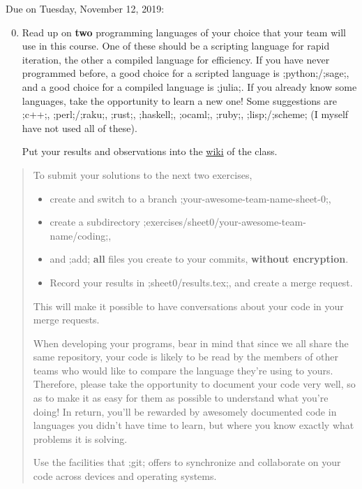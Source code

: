 \documentclass[11pt]{amsart}
\newcommand{\alert}[1]{\textbf{\color{red}#1}}
\begin{document}
\bigskip\bigskip
\begin{center}
  \color{blue}Due on Tuesday, November 12, 2019:
\end{center}

\medskip
\begin{enumerate}
  \setcounter{enumi}{-1}
\item
  Read up on \alert{two} programming languages of your choice that your team will use in this course.
  One of these should be a scripting language for rapid iteration, the other a compiled language for efficiency.
  If you have never programmed before, a good choice for a scripted language is ;python;/;sage;, and a good choice for a compiled language is ;julia;.
  If you already know some languages, take the opportunity to learn a new one! Some suggestions are ;c++;, ;perl;/;raku;, ;rust;, ;haskell;, ;ocaml;, ;ruby;, ;lisp;/;scheme;
  (I myself have not used all of these).

  \medskip
  Put your results and observations into the \href{https://gitlab.mat-apl.upc.edu/julian.pfeifle/2019-dag-upc/wikis/programming-languages}{wiki} of the class.
\end{enumerate}

\bigskip

\begin{quotation}\small
  To submit your solutions to the next two exercises,

  \medskip
  \begin{itemize}[$\quad\triangleright$]
  \item create and switch to a branch ;your-awesome-team-name-sheet-0;,
  \item create a subdirectory ;exercises/sheet0/your-awesome-team-name/coding;,
  \item and ;add; \alert{all} files you create to your commits, \alert{without encryption}.
  \item Record your results in ;sheet0/results.tex;, and create a merge request.
  \end{itemize}

  \medskip
  \noindent This will make it possible to have conversations about your code in your merge requests.

  \medskip
  When developing your programs, bear in mind that since we all share the same repository,
  your code is likely to be read by the members of other teams who would like to compare the language they're using to yours.
  Therefore, please take the opportunity to document your code very well, so as to make it as easy for them as possible to understand what you're doing!
  In return, you'll be rewarded by awesomely documented code in languages you didn't have time to learn, but where you know exactly what problems it is solving.

  \medskip
  Use the facilities that ;git; offers to synchronize and collaborate on your code across devices and operating systems.
\end{quotation}
\end{document}
